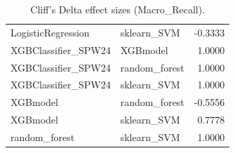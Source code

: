 \begin{table}[t]
\begin{tabular}{llr}
LogisticRegression & sklearn_SVM & -0.3333 \\
XGBClassifier_SPW24 & XGBmodel & 1.0000 \\
XGBClassifier_SPW24 & random_forest & 1.0000 \\
XGBClassifier_SPW24 & sklearn_SVM & 1.0000 \\
XGBmodel & random_forest & -0.5556 \\
XGBmodel & sklearn_SVM & 0.7778 \\
random_forest & sklearn_SVM & 1.0000 \\
\bottomrule
\end{tabular}
\caption{Cliff's Delta effect sizes (Macro_Recall).}
\label{tab:cliffs_Macro_Recall}
\end{table}